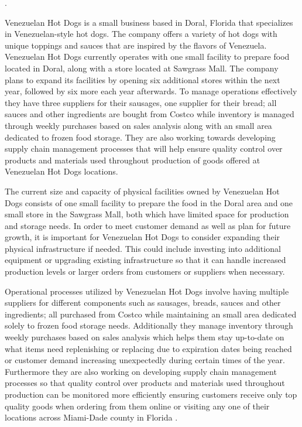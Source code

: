 .

Venezuelan Hot Dogs is a small business based in Doral, Florida that specializes in Venezuelan-style hot dogs. The company offers a variety of hot dogs with unique toppings and sauces that are inspired by the flavors of Venezuela. Venezuelan Hot Dogs currently operates with one small facility to prepare food located in Doral, along with a store located at Sawgrass Mall. The company plans to expand its facilities by opening six additional stores within the next year, followed by six more each year afterwards. To manage operations effectively they have three suppliers for their sausages, one supplier for their bread; all sauces and other ingredients are bought from Costco while inventory is managed through weekly purchases based on sales analysis along with an small area dedicated to frozen food storage. They are also working towards developing supply chain management processes that will help ensure quality control over products and materials used throughout production of goods offered at Venezuelan Hot Dogs locations. 

The current size and capacity of physical facilities owned by Venezuelan Hot Dogs consists of one small facility to prepare the food in the Doral area and one small store in the Sawgrass Mall, both which have limited space for production and storage needs. In order to meet customer demand as well as plan for future growth, it is important for Venezuelan Hot Dogs to consider expanding their physical infrastructure if needed. This could include investing into additional equipment or upgrading existing infrastructure so that it can handle increased production levels or larger orders from customers or suppliers when necessary. 

Operational processes utilized by Venezuelan Hot Dogs involve having multiple suppliers for different components such as sausages, breads, sauces and other ingredients; all purchased from Costco while maintaining an small area dedicated solely to frozen food storage needs. Additionally they manage inventory through weekly purchases based on sales analysis which helps them stay up-to-date on what items need replenishing or replacing due to expiration dates being reached or customer demand increasing unexpectedly during certain times of the year. Furthermore they are also working on developing supply chain management processes so that quality control over products and materials used throughout production can be monitored more efficiently ensuring customers receive only top quality goods when ordering from them online or visiting any one of their locations across Miami-Dade county in Florida . 

